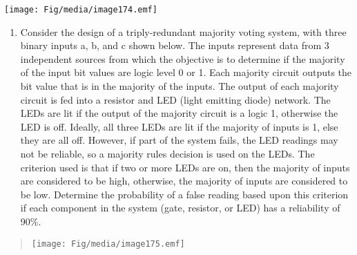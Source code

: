 \texttt{[image: Fig/media/image174.emf]}

\begin{enumerate}
\def\labelenumi{\arabic{enumi}.}
\setcounter{enumi}{11}
\item
  Consider the design of a triply-redundant majority voting system, with
  three binary inputs a, b, and c shown below. The inputs represent data
  from 3 independent sources from which the objective is to determine if
  the majority of the input bit values are logic level 0 or 1. Each
  majority circuit outputs the bit value that is in the majority of the
  inputs. The output of each majority circuit is fed into a resistor and
  LED (light emitting diode) network. The LEDs are lit if the output of
  the majority circuit is a logic 1, otherwise the LED is off. Ideally,
  all three LEDs are lit if the majority of inputs is 1, else they are
  all off. However, if part of the system fails, the LED readings may
  not be reliable, so a majority rules decision is used on the LEDs. The
  criterion used is that if two or more LEDs are on, then the majority
  of inputs are considered to be high, otherwise, the majority of inputs
  are considered to be low. Determine the probability of a false reading
  based upon this criterion if each component in the system (gate,
  resistor, or LED) has a reliability of 90\%.
\end{enumerate}

\begin{quote}
\texttt{[image: Fig/media/image175.emf]}
\end{quote}
